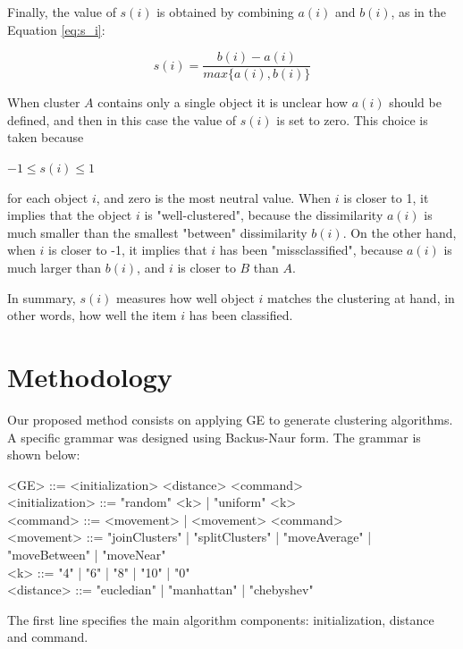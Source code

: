 \documentclass[journal]{IEEEtran}
\begin{document}
	Finally, the value of $s(i)$ is obtained by combining $a(i)$ and $b(i)$, as in the Equation \ref{eq:s_i}:
	
	\begin{equation} \label{eq:s_i}
	s(i) = \frac{b(i) - a(i)}{max\{a(i), b(i)\}}
	\end{equation}
	
	When cluster $A$ contains only a single object it is unclear how $a(i)$ should be defined, and then in this case the value of $s(i)$ is set to zero. This choice is taken because
	\begin{center}
		$-1 \le s(i) \le 1$
	\end{center}
	
	for each object $i$, and zero is the most neutral value. When $i$ is closer to 1, it implies that the object $i$ is "well-clustered", because the dissimilarity $a(i)$ is much smaller than the smallest "between" dissimilarity $b(i)$. On the other hand, when $i$ is closer to -1, it implies that $i$ has been "missclassified", because $a(i)$ is much larger than $b(i)$, and $i$ is closer to $B$ than $A$.
	
	In summary, $s(i)$ measures how well object $i$ matches the clustering at hand, in other words, how well the item $i$ has been classified.
	
	
	\section{Methodology} \label{sec:methodology}
	
	Our proposed method consists on applying GE to generate clustering algorithms. A specific grammar was designed  using  Backus-Naur form. The grammar is shown below:
	
	\begin{grammar}
		<GE> ::= <initialization> <distance> <command> 
		\\ <initialization> ::= "random" <k> | "uniform" <k>
		\\ <command> ::= <movement> | <movement> <command>
		\\ <movement> ::= "joinClusters" | "splitClusters" | "moveAverage" | "moveBetween" | "moveNear" 
		\\ <k> ::= "4" | "6" | "8" | "10" | "0"
		\\ <distance> ::= "eucledian" | "manhattan" | "chebyshev"
		\label{ge-clustering-grammar}
	\end{grammar}
	
	The first line specifies the main algorithm components: initialization, distance and command. 
	
\end{document}
